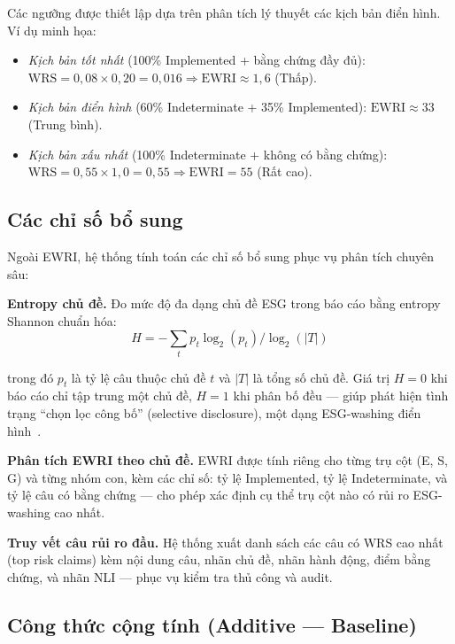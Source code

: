 Các ngưỡng được thiết lập dựa trên phân tích lý thuyết các kịch bản điển hình. Ví dụ minh họa:
\begin{itemize}
    \item \textit{Kịch bản tốt nhất} (100\% Implemented + bằng chứng đầy đủ): $\text{WRS} = 0{,}08 \times 0{,}20 = 0{,}016 \Rightarrow \text{EWRI} \approx 1{,}6$ (Thấp).
    \item \textit{Kịch bản điển hình} (60\% Indeterminate + 35\% Implemented): $\text{EWRI} \approx 33$ (Trung bình).
    \item \textit{Kịch bản xấu nhất} (100\% Indeterminate + không có bằng chứng): $\text{WRS} = 0{,}55 \times 1{,}0 = 0{,}55 \Rightarrow \text{EWRI} = 55$ (Rất cao).
\end{itemize}


\subsection{Các chỉ số bổ sung}
\label{subsec:additional_metrics}

Ngoài EWRI, hệ thống tính toán các chỉ số bổ sung phục vụ phân tích chuyên sâu:

\textbf{Entropy chủ đề.} Đo mức độ đa dạng chủ đề ESG trong báo cáo bằng entropy Shannon chuẩn hóa:
\begin{equation}
    H = -\sum_{t} p_t \log_2(p_t) \Big/ \log_2(|T|)
    \label{eq:topic_entropy}
\end{equation}

\noindent trong đó $p_t$ là tỷ lệ câu thuộc chủ đề $t$ và $|T|$ là tổng số chủ đề. Giá trị $H = 0$ khi báo cáo chỉ tập trung một chủ đề, $H = 1$ khi phân bố đều --- giúp phát hiện tình trạng ``chọn lọc công bố'' (selective disclosure), một dạng ESG-washing điển hình~\cite{marquis2016scrutiny}.

\textbf{Phân tích EWRI theo chủ đề.} EWRI được tính riêng cho từng trụ cột (E, S, G) và từng nhóm con, kèm các chỉ số: tỷ lệ Implemented, tỷ lệ Indeterminate, và tỷ lệ câu có bằng chứng --- cho phép xác định cụ thể trụ cột nào có rủi ro ESG-washing cao nhất.

\textbf{Truy vết câu rủi ro đầu.} Hệ thống xuất danh sách các câu có WRS cao nhất (top risk claims) kèm nội dung câu, nhãn chủ đề, nhãn hành động, điểm bằng chứng, và nhãn NLI --- phục vụ kiểm tra thủ công và audit.


\subsection{Công thức cộng tính (Additive --- Baseline)}
\label{subsec:additive_formula}

